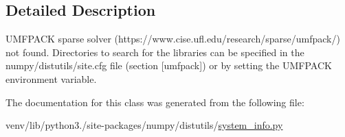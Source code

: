 \subsection{Detailed Description}
\begin{DoxyVerb}UMFPACK sparse solver (https://www.cise.ufl.edu/research/sparse/umfpack/)
not found. Directories to search for the libraries can be specified in the
numpy/distutils/site.cfg file (section [umfpack]) or by setting
the UMFPACK environment variable.\end{DoxyVerb}
 

The documentation for this class was generated from the following file\+:\begin{DoxyCompactItemize}
\item 
venv/lib/python3./site-\/packages/numpy/distutils/\hyperlink{system__info_8py}{system\+\_\+info.\+py}\end{DoxyCompactItemize}
